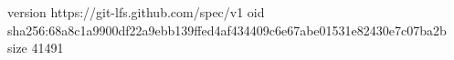 version https://git-lfs.github.com/spec/v1
oid sha256:68a8c1a9900df22a9ebb139ffed4af434409c6e67abe01531e82430e7c07ba2b
size 41491
